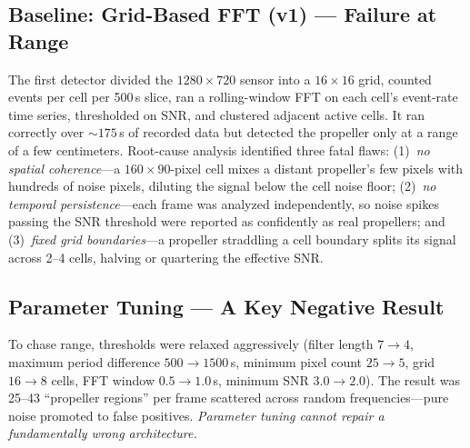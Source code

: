 \documentclass[conference]{IEEEtran}
\begin{document}
\subsection{Baseline: Grid-Based FFT (v1) --- Failure at Range}
The first detector divided the $1280\times720$ sensor into a
$16\times16$ grid, counted events per cell per 500\,\textmu s slice, ran a
rolling-window FFT on each cell's event-rate time series, thresholded on
SNR, and clustered adjacent active cells. It ran correctly over
${\sim}175$\,s of recorded data but detected the propeller only at a
range of a few centimeters. Root-cause analysis identified three fatal
flaws: (1)~\emph{no spatial coherence}---a $160\times90$-pixel cell mixes
a distant propeller's few pixels with hundreds of noise pixels, diluting
the signal below the cell noise floor; (2)~\emph{no temporal
persistence}---each frame was analyzed independently, so noise spikes
passing the SNR threshold were reported as confidently as real
propellers; and (3)~\emph{fixed grid boundaries}---a propeller straddling
a cell boundary splits its signal across 2--4 cells, halving or
quartering the effective SNR.

\subsection{Parameter Tuning --- A Key Negative Result}
To chase range, thresholds were relaxed aggressively (filter length
$7\!\to\!4$, maximum period difference $500\!\to\!1500$\,\textmu s,
minimum pixel count $25\!\to\!5$, grid $16\!\to\!8$ cells, FFT window
$0.5\!\to\!1.0$\,s, minimum SNR $3.0\!\to\!2.0$). The result was 25--43
``propeller regions'' per frame scattered across random
frequencies---pure noise promoted to false positives. \emph{Parameter
tuning cannot repair a fundamentally wrong architecture.}
\end{document}

